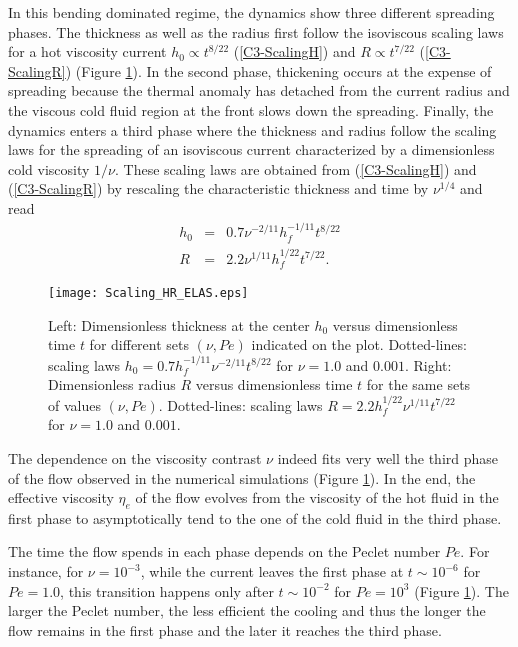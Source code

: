 In this  bending dominated regime,  the dynamics show  three different
spreading phases.   The thickness as  well as the radius  first follow
the   isoviscous   scaling   laws   for  a   hot   viscosity   current
$h_0\propto  t^{8/22}$  (\ref{C3-ScalingH})  and  $R\propto  t^{7/22}$
(\ref{C3-ScalingR}) (Figure \ref{C3-Scaling_HR_ELAS}).   In the second
phase,  thickening occurs  at  the expense  of  spreading because  the
thermal anomaly has  detached from the current radius  and the viscous
cold fluid region at the front slows down the spreading.  Finally, the
dynamics enters  a third phase  where the thickness and  radius follow
the  scaling  laws   for  the  spreading  of   an  isoviscous  current
characterized by a dimensionless cold viscosity $1/\nu$. These scaling
laws are obtained from  (\ref{C3-ScalingH}) and (\ref{C3-ScalingR}) by
rescaling  the characteristic  thickness and  time by  $\nu^{1/4}$ and
read
\begin{eqnarray}
  h_{0} & = &0.7 \nu^{-2/11} h_f^{-1/11}t^{8/22}\label{C3-ScalingH-Visco}\\
  R& = & 2.2 \nu^{1/11}h_f^{1/22} t^{7/22}\label{C3-ScalingR-Visco}.
\end{eqnarray}
\begin{figure}
  \begin{center}
    \graphicspath{ {/Users/thorey/Documents/These/Projet/Refroidissement/Skin_Model/Figure/JFM_V13/} }
    \texttt{[image: Scaling\_HR\_ELAS.eps]}
    \caption{Left: Dimensionless thickness at  the center $h_0$ versus
      dimensionless time  $t$ for different sets  $(\nu,Pe)$ indicated
      on      the      plot.      Dotted-lines:      scaling      laws
      $h_0=  0.7h_f^{-1/11}\nu^{-2/11}t^{8/22}$ for  $\nu  = 1.0$  and
      $0.001$.  Right:  Dimensionless radius $R$  versus dimensionless
      time $t$ for the same  sets of values $(\nu,Pe)$.  Dotted-lines:
      scaling    laws    $R=   2.2h_f^{1/22}\nu^{1/11}t^{7/22}$    for
      $\nu = 1.0$ and $0.001$.}
    \label{C3-Scaling_HR_ELAS}
  \end{center}
\end{figure}
The dependence on  the viscosity contrast $\nu$ indeed  fits very well
the  third phase  of the  flow observed  in the  numerical simulations
(Figure   \ref{C3-Scaling_HR_ELAS}).   In   the  end,   the  effective
viscosity $\eta_e$ of  the flow evolves from the viscosity  of the hot
fluid in the first phase to asymptotically tend to the one of the cold
fluid in the third phase.

The time  the flow spends in  each phase depends on  the Peclet number
$Pe$.  For instance,  for $\nu=10^{-3}$, while the  current leaves the
first phase at $t \sim 10^{-6}$ for $Pe =1.0$, this transition happens
only   after   $t   \sim   10^{-2}$    for   $Pe   =   10^3$   (Figure
\ref{C3-Scaling_HR_ELAS}).   The larger  the Peclet  number, the  less
efficient the  cooling and  thus the  longer the  flow remains  in the
first phase and the later it reaches the third phase.

